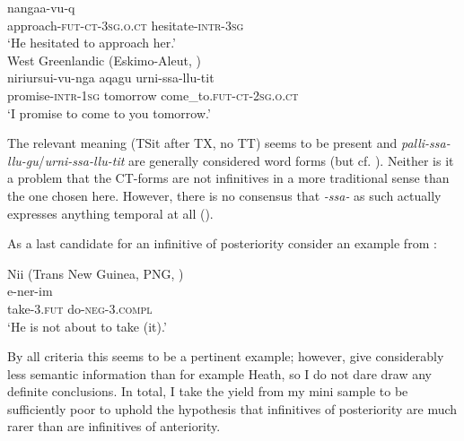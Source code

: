 \documentclass[output=paper,hidelinks]{langscibook}
\begin{document}
				{nangaa-vu-q}\\
approach-\textsc{fut-ct-3sg.o.ct}		hesitate-\textsc{intr}-\textsc{3sg}\\
\glt ‘He hesitated to approach her.’ \\
\ex\label{ex:reiner:11} West Greenlandic (Eskimo-Aleut, \citealt[276]{Fortescue1984}) \\
\gll    niriursui-vu-nga    aqagu		urni-ssa-llu-tit \\
        promise-\textsc{intr}-\textsc{1sg} tomorrow	come\_to.\textsc{fut-ct-2sg.o.ct}\\
\glt    ‘I promise to come to you tomorrow.’\\
\z 

The relevant meaning (TSit after TX, no TT) seems to be present and \emph{palli-ssa-llu-gu}\slash\emph{urni-ssa-llu-tit} are generally considered word forms (but cf. \citealt{Haspelmath2018}). Neither is it a problem that the CT-forms are not infinitives in a more traditional sense than the one chosen here. However, there is no consensus that \emph{-ssa-} as such actually expresses anything temporal at all (\citealt{Bittner2005}).

As a last candidate for an infinitive of posteriority consider an example from :

\ea\label{ex:reiner:12} Nii (Trans New Guinea, PNG, \citealt[80]{StuckyStucky1976})\\
		{e-ner-im}\\
    take-\textsc{3.fut}	do-\textsc{neg-3.compl}\\
\glt ‘He is not about to take (it).’\\
\z 

By all criteria this seems to be a pertinent example; however, \citet{StuckyStucky1976} give considerably less semantic information than for example Heath, so I do not dare draw any definite conclusions.
In total, I take the yield from my mini sample to be sufficiently poor to uphold the hypothesis that infinitives of posteriority are much rarer than are infinitives of anteriority.
\end{document}
